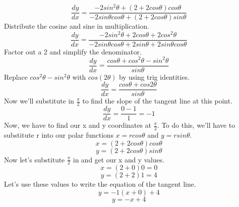 \documentclass[a4paper,openright, 14pt]{article}
\begin{document}
$$\frac{dy}{dx}=\frac{-2sin^2\theta+(2+2cos\theta)cos\theta}{-2sin\theta cos\theta+(2+2cos\theta)sin\theta}$$
Distribute the cosine and sine in multiplication.
$$\frac{dy}{dx}=\frac{-2sin^2\theta+2cos\theta+2cos^2\theta}{-2sin\theta cos\theta+2sin\theta+2sin\theta cos\theta}$$
Factor out a 2 and simplify the denominator.
$$\frac{dy}{dx}=\frac{cos\theta+cos^2\theta-sin^2\theta}{sin\theta}$$
Replace $cos^2\theta-sin^2\theta$ with $cos(2\theta)$ by using trig identities.
$$\frac{dy}{dx}=\frac{cos\theta+cos2\theta}{sin\theta}$$
Now we'll substitute in $\frac{\pi}{2}$ to find the slope of the tangent line at this point. 
$$\frac{dy}{dx}=\frac{0-1}{1}=-1$$
Now, we have to find our x and y coordinates at $\frac{\pi}{2}$. To do this, we'll have to substitute r into our polar functions $x=rcos\theta$ and $y=rsin\theta$. 
$$x=(2+2cos\theta)cos\theta$$
$$y=(2+2cos\theta)sin\theta$$
Now let's substitute $\frac{\pi}{2}$ in and get our x and y values. 
$$x=(2+0)0=0$$
$$y=(2+2)1=4$$
Let's use these values to write the equation of the tangent line. 
$$y=-1(x+0)+4$$
$$y=-x+4$$
\end{document}
